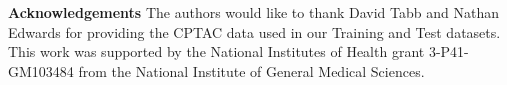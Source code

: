 \documentclass[endnotes,11pt]{article}
\begin{document}


{\bf Acknowledgements}
The authors would like to thank David Tabb and Nathan Edwards for providing the CPTAC data used in our Training and Test datasets. This work was supported by the National Institutes of Health grant 3-P41-GM103484 from the National Institute of General Medical Sciences.


\newpage

\end{document}
